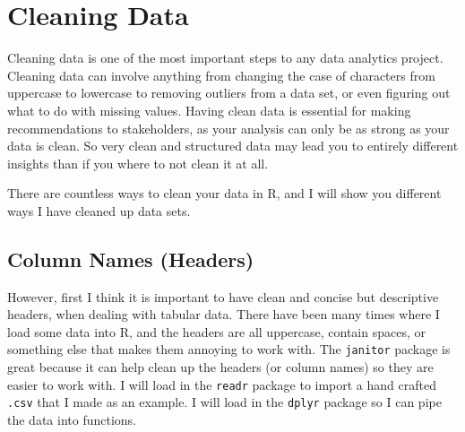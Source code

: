 \documentclass[
  letterpaper,
  DIV=11,
  numbers=noendperiod]{scrreprt}
\begin{document}

\hypertarget{cleaning-data}{%
\chapter{\texorpdfstring{\textbf{Cleaning
Data}}{Cleaning Data}}\label{cleaning-data}}

Cleaning data is one of the most important steps to any data analytics
project. Cleaning data can involve anything from changing the case of
characters from uppercase to lowercase to removing outliers from a data
set, or even figuring out what to do with missing values. Having clean
data is essential for making recommendations to stakeholders, as your
analysis can only be as strong as your data is clean. So very clean and
structured data may lead you to entirely different insights than if you
where to not clean it at all.

There are countless ways to clean your data in R, and I will show you
different ways I have cleaned up data sets.

\hypertarget{column-names-headers}{%
\section{\texorpdfstring{\textbf{Column Names
(Headers)}}{Column Names (Headers)}}\label{column-names-headers}}

However, first I think it is important to have clean and concise but
descriptive headers, when dealing with tabular data. There have been
many times where I load some data into R, and the headers are all
uppercase, contain spaces, or something else that makes them annoying to
work with. The \texttt{janitor} package is great because it can help
clean up the headers (or column names) so they are easier to work with.
I will load in the \texttt{readr} package to import a hand crafted
\texttt{.csv} that I made as an example. I will load in the
\texttt{dplyr} package so I can pipe the data into functions.
\end{document}

